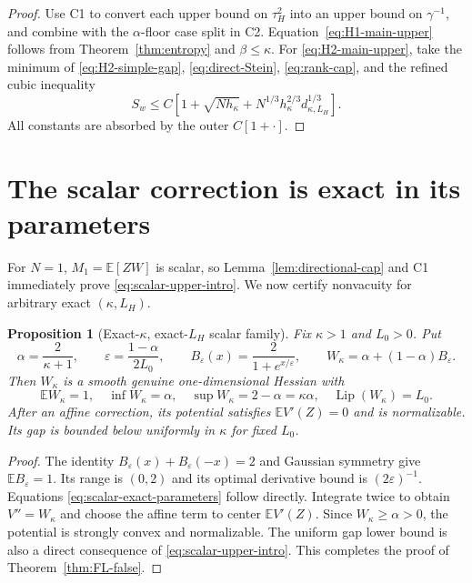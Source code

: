 \documentclass[11pt]{article}
\numberwithin{equation}{section}
\newtheorem{proposition}[theorem]{Proposition}
\DeclareMathOperator{\Lip}{Lip}
\newcommand{\E}{\mathbb E}
\begin{document}
\begin{proof}
Use C1 to convert each upper bound on $\tau_H^2$ into an upper bound on
$\gamma^{-1}$, and combine with the $\alpha$-floor case split in C2.
Equation~\eqref{eq:H1-main-upper} follows from
Theorem~\ref{thm:entropy} and $\beta\le\kappa$.
For \eqref{eq:H2-main-upper}, take the minimum of
\eqref{eq:H2-simple-gap}, \eqref{eq:direct-Stein},
\eqref{eq:rank-cap}, and the refined cubic inequality
\[
 S_w\le C\left[1+\sqrt{Nh_\kappa}
 +N^{1/3}h_\kappa^{2/3}d_{\kappa,L_H}^{1/3}\right].
\]
All constants are absorbed by the outer $C[1+\cdot]$.
\end{proof}

\section{The scalar correction is exact in its parameters}\label{sec:scalar}

For $N=1$, $M_1=\E[ZW]$ is scalar, so
Lemma~\ref{lem:directional-cap} and C1 immediately prove
\eqref{eq:scalar-upper-intro}.  We now certify nonvacuity for arbitrary exact
$(\kappa,L_H)$.

\begin{proposition}[Exact-$\kappa$, exact-$L_H$ scalar family]
\label{prop:scalar-logistic}
Fix $\kappa>1$ and $L_0>0$.  Put
\begin{equation}\label{eq:scalar-logistic}
 \alpha=\frac2{\kappa+1},\qquad
 \varepsilon=\frac{1-\alpha}{2L_0},\qquad
 B_\varepsilon(x)=\frac2{1+e^{x/\varepsilon}},\qquad
 W_\kappa=\alpha+(1-\alpha)B_\varepsilon.
\end{equation}
Then $W_\kappa$ is a smooth genuine one-dimensional Hessian with
\begin{equation}\label{eq:scalar-exact-parameters}
 \E W_\kappa=1,\quad
 \inf W_\kappa=\alpha,\quad
 \sup W_\kappa=2-\alpha=\kappa\alpha,\quad
 \Lip(W_\kappa)=L_0.
\end{equation}
After an affine correction, its potential satisfies $\E V'(Z)=0$ and is
normalizable.  Its gap is bounded below uniformly in $\kappa$ for fixed
$L_0$.
\end{proposition}

\begin{proof}
The identity $B_\varepsilon(x)+B_\varepsilon(-x)=2$ and Gaussian symmetry
give $\E B_\varepsilon=1$.  Its range is $(0,2)$ and its optimal derivative
bound is $(2\varepsilon)^{-1}$.  Equations
\eqref{eq:scalar-exact-parameters} follow directly.  Integrate twice to
obtain $V''=W_\kappa$ and choose the affine term to center $\E V'(Z)$.
Since $W_\kappa\ge\alpha>0$, the potential is strongly convex and
normalizable.  The uniform gap lower bound is also a direct consequence of
\eqref{eq:scalar-upper-intro}.  This completes the proof of
Theorem~\ref{thm:FL-false}.
\end{proof}
\end{document}
